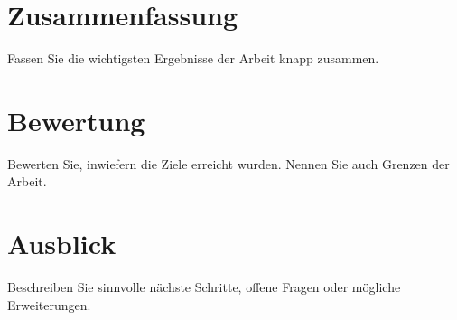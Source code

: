 
\section{Zusammenfassung}

Fassen Sie die wichtigsten Ergebnisse der Arbeit knapp zusammen.

\section{Bewertung}

Bewerten Sie, inwiefern die Ziele erreicht wurden. Nennen Sie auch Grenzen der
Arbeit.

\section{Ausblick}

Beschreiben Sie sinnvolle nächste Schritte, offene Fragen oder mögliche
Erweiterungen.
